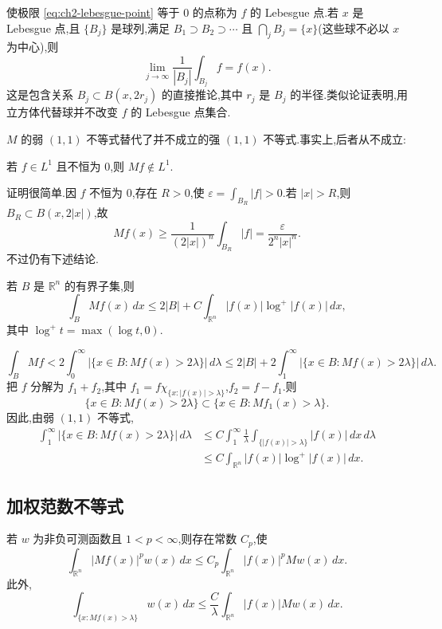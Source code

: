 使极限 \eqref{eq:ch2-lebesgue-point} 等于 $0$ 的点称为 $f$ 的 Lebesgue 点.若 $x$ 是 Lebesgue 点,且 $\{B_j\}$ 是球列,满足 $B_1\supset B_2\supset\cdots$ 且 $\bigcap_jB_j=\{x\}$(这些球不必以 $x$ 为中心),则
\[
 \lim_{j\to\infty}\frac1{|B_j|}\int_{B_j}f=f(x).
\]
这是包含关系 $B_j\subset B(x,2r_j)$ 的直接推论,其中 $r_j$ 是 $B_j$ 的半径.类似论证表明,用立方体代替球并不改变 $f$ 的 Lebesgue 点集合.

$M$ 的弱 $(1,1)$ 不等式替代了并不成立的强 $(1,1)$ 不等式.事实上,后者从不成立:

\begin{Proposition}
\label{prop:ch2-maximal-not-l1}
若 $f\in L^1$ 且不恒为 $0$,则 $Mf\notin L^1$.
\end{Proposition}

证明很简单.因 $f$ 不恒为 $0$,存在 $R>0$,使 $\varepsilon=\int_{B_R}|f|>0$.若 $|x|>R$,则 $B_R\subset B(x,2|x|)$,故
\[
 Mf(x)\ge\frac1{(2|x|)^n}\int_{B_R}|f|
 =\frac{\varepsilon}{2^n|x|^n}.
\]
不过仍有下述结论.

\hypertarget{sample-page-049}{}
\begin{Theorem}
\label{thm:ch2-local-l-log-l}
若 $B$ 是 $\mathbb R^n$ 的有界子集,则
\[
 \int_BMf(x)\,dx\le 2|B|+C\int_{\mathbb R^n}|f(x)|\log^+|f(x)|\,dx,
\]
其中 $\log^+t=\max(\log t,0)$.
\end{Theorem}

\begin{Proof}
\[
 \int_BMf<2\int_0^\infty|\{x\in B:Mf(x)>2\lambda\}|\,d\lambda
 \le2|B|+2\int_1^\infty|\{x\in B:Mf(x)>2\lambda\}|\,d\lambda.
\]
把 $f$ 分解为 $f_1+f_2$,其中 $f_1=f\chi_{\{x:|f(x)|>\lambda\}}$,$f_2=f-f_1$.则
\[
 \{x\in B:Mf(x)>2\lambda\}\subset\{x\in B:Mf_1(x)>\lambda\}.
\]
因此,由弱 $(1,1)$ 不等式,
\[
\begin{aligned}
 \int_1^\infty|\{x\in B:Mf(x)>2\lambda\}|\,d\lambda
 &\le C\int_1^\infty\frac1\lambda
 \int_{\{|f(x)|>\lambda\}}|f(x)|\,dx\,d\lambda\\
 &\le C\int_{\mathbb R^n}|f(x)|\log^+|f(x)|\,dx.
\end{aligned}
\]
\end{Proof}

\subsection{加权范数不等式}
\label{sec:ch2-weighted-norm-inequality}

\begin{Theorem}
\label{thm:ch2-weighted-maximal}
若 $w$ 为非负可测函数且 $1<p<\infty$,则存在常数 $C_p$,使
\[
 \int_{\mathbb R^n}|Mf(x)|^pw(x)\,dx
 \le C_p\int_{\mathbb R^n}|f(x)|^pMw(x)\,dx.
\]
此外,
\begin{equation}
\label{eq:ch2-weighted-weak-bound}
 \int_{\{x:Mf(x)>\lambda\}}w(x)\,dx
 \le\frac{C}{\lambda}\int_{\mathbb R^n}|f(x)|Mw(x)\,dx.
\end{equation}
\end{Theorem}


